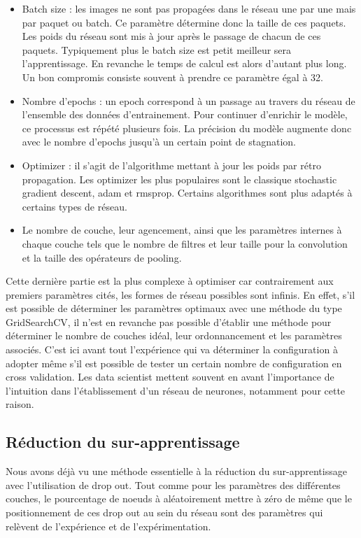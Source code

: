 \begin{itemize}
\item Batch size : les images ne sont pas propagées dans le réseau une par une mais par 
paquet ou batch. Ce paramètre détermine donc la taille de ces paquets. Les poids du réseau
sont mis à jour après le passage de chacun de ces paquets. Typiquement plus le batch size
est petit meilleur sera l'apprentissage. En revanche le temps de calcul est alors d'autant
plus long. Un bon compromis consiste souvent à prendre ce paramètre égal à 32.
\item Nombre d'epochs : un epoch correspond à un passage au travers du réseau de 
l'ensemble des données d'entrainement. Pour continuer d'enrichir le modèle, ce processus 
est répété plusieurs fois. La précision du modèle augmente donc avec le nombre d'epochs 
jusqu'à un certain point de stagnation. 
\item Optimizer : il s'agit de l'algorithme mettant à jour les poids par rétro propagation.
Les optimizer les plus populaires sont le classique stochastic gradient descent, adam et
rmsprop. Certains algorithmes sont plus adaptés à certains types de réseau. 
\item Le nombre de couche, leur agencement, ainsi que les paramètres internes 
à chaque couche tels que le nombre de filtres et leur taille pour la convolution
et la taille des opérateurs de pooling. 
\end{itemize}

Cette dernière partie est la plus complexe à optimiser car contrairement aux premiers 
paramètres cités, les formes de réseau possibles sont infinis. En effet, s'il est possible 
de déterminer les paramètres optimaux avec une méthode du type GridSearchCV, il n'est en 
revanche pas possible d'établir une méthode pour déterminer le nombre de couches idéal, 
leur ordonnancement et les paramètres associés. C'est ici avant tout l'expérience qui va 
déterminer la configuration à adopter même s'il est possible de tester un certain nombre de
configuration en cross validation. Les data scientist mettent souvent en avant l'importance
de l'intuition dans l'établissement d'un réseau de neurones, notamment pour cette raison.

\subsection{Réduction du sur-apprentissage}

Nous avons déjà vu une méthode essentielle à la réduction du sur-apprentissage avec 
l'utilisation de drop out. Tout comme pour les paramètres des différentes couches, le 
pourcentage de noeuds à aléatoirement mettre à zéro de même que le positionnement de ces
drop out au sein du réseau sont des paramètres qui relèvent de l'expérience et de 
l'expérimentation. 

